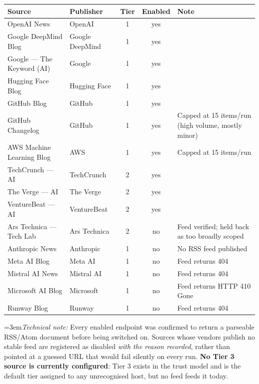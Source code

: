 \documentclass[11pt,a4paper]{article}
\newcommand{\technote}[1]{\par\vspace{-0.25em}\begingroup\footnotesize\color{aitkGray}\sloppy\emergencystretch=3em\textit{Technical note:} #1\par\endgroup}
\begin{document}
\begin{center}
\footnotesize
\begin{tabularx}{\textwidth}{@{}l l c c >{\RaggedRight}X@{}}
\toprule
\textbf{Source} & \textbf{Publisher} & \textbf{Tier} & \textbf{Enabled} & \textbf{Note} \\
\midrule
OpenAI News & OpenAI & 1 & \textcolor{aitkGo}{yes} & \\
Google DeepMind Blog & Google DeepMind & 1 & \textcolor{aitkGo}{yes} & \\
Google --- The Keyword (AI) & Google & 1 & \textcolor{aitkGo}{yes} & \\
Hugging Face Blog & Hugging Face & 1 & \textcolor{aitkGo}{yes} & \\
GitHub Blog & GitHub & 1 & \textcolor{aitkGo}{yes} & \\
GitHub Changelog & GitHub & 1 & \textcolor{aitkGo}{yes} & Capped at 15 items/run (high volume, mostly minor) \\
AWS Machine Learning Blog & AWS & 1 & \textcolor{aitkGo}{yes} & Capped at 15 items/run \\
\midrule
TechCrunch --- AI & TechCrunch & 2 & \textcolor{aitkGo}{yes} & \\
The Verge --- AI & The Verge & 2 & \textcolor{aitkGo}{yes} & \\
VentureBeat --- AI & VentureBeat & 2 & \textcolor{aitkGo}{yes} & \\
\midrule
Ars Technica --- Tech Lab & Ars Technica & 2 & \textcolor{aitkStop}{no} & Feed verified; held back as too broadly scoped \\
Anthropic News & Anthropic & 1 & \textcolor{aitkStop}{no} & No RSS feed published \\
Meta AI Blog & Meta AI & 1 & \textcolor{aitkStop}{no} & Feed returns 404 \\
Mistral AI News & Mistral AI & 1 & \textcolor{aitkStop}{no} & Feed returns 404 \\
Microsoft AI Blog & Microsoft & 1 & \textcolor{aitkStop}{no} & Feed returns HTTP 410 Gone \\
Runway Blog & Runway & 1 & \textcolor{aitkStop}{no} & Feed returns 404 \\
\bottomrule
\end{tabularx}
\end{center}

\technote{Every enabled endpoint was confirmed to return a parseable RSS/Atom
document before being switched on. Sources whose vendors publish no stable feed
are registered as disabled \emph{with the reason recorded}, rather than pointed at
a guessed URL that would fail silently on every run. \textbf{No Tier 3 source is
currently configured}: Tier 3 exists in the trust model and is the default tier
assigned to any unrecognised host, but no feed feeds it today.}
\end{document}
